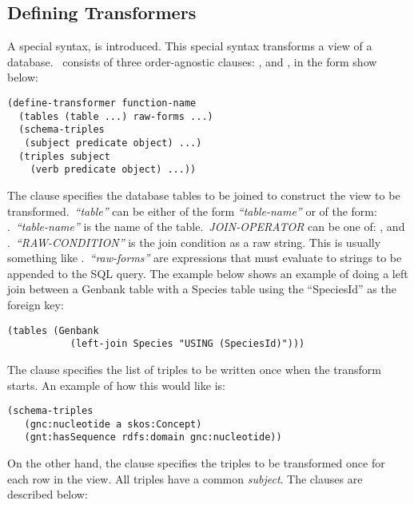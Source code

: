 \subsection{Defining Transformers}

A special syntax,  is introduced.  This special syntax transforms a view of a database.\    consists of three order-agnostic clauses: ,  and , in the form show below:

\begin{Verbatim}[frame=single]
(define-transformer function-name
  (tables (table ...) raw-forms ...)
  (schema-triples
   (subject predicate object) ...)
  (triples subject
    (verb predicate object) ...))
\end{Verbatim}

The  clause specifies the database tables to be joined to construct the view to be transformed.\   \textit{``table''} can be either of the form \textit{``table-name''} or of the form: .\   \textit{``table-name''} is the name of the table.\   \textit{JOIN-OPERATOR} can be one of: ,  and .\   \textit{``RAW-CONDITION''} is the join condition as a raw string.  This is usually something like .\   \textit{``raw-forms''} are expressions that must evaluate to strings to be appended to the SQL query.  The example below shows an example of doing a left join between a Genbank table with a Species table using the ``SpeciesId'' as the foreign key:

\begin{Verbatim}[frame=single]
(tables (Genbank
           (left-join Species "USING (SpeciesId)")))
\end{Verbatim}

The  clause specifies the list of triples to be written once when the transform starts.  An example of how this would like is:

\begin{Verbatim}[frame=single]
(schema-triples
   (gnc:nucleotide a skos:Concept)
   (gnt:hasSequence rdfs:domain gnc:nucleotide))
\end{Verbatim}

On the other hand, the  clause specifies the triples to be transformed once for each row in the view.  All triples have a common \textit{subject}.  The  clauses are described below:

